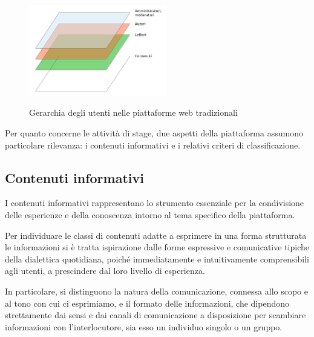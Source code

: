 \begin{figure}[ht]
	\begin{center}
		\includegraphics[width=6cm]{img/gerarchia-utenti.png}
		\label{fig:tesi:progetto:gerarchia-utenti}
		\caption{Gerarchia degli utenti nelle piattaforme web tradizionali}
	\end{center}
\end{figure}

Per quanto concerne le attività di stage, due aspetti della piattaforma assumono particolare rilevanza: i contenuti informativi e i relativi criteri di classificazione.

\subsection{Contenuti informativi}
\label{sec:tesi:progetto:contenuti}
I contenuti informativi rappresentano lo strumento essenziale per la condivisione delle esperienze e della conoscenza intorno al tema specifico della piattaforma.

Per individuare le classi di contenuti adatte a esprimere in una forma strutturata le informazioni si è tratta ispirazione dalle forme espressive e comunicative tipiche della dialettica quotidiana, poiché immediatamente e intuitivamente comprensibili agli utenti, a prescindere dal loro livello di esperienza.

In particolare, si distinguono la natura della comunicazione, connessa allo scopo e al tono con cui ci esprimiamo, e il formato delle informazioni, che dipendono strettamente dai sensi e dai canali di comunicazione a disposizione per scambiare informazioni con l'interlocutore, sia esso un individuo singolo o un gruppo.

